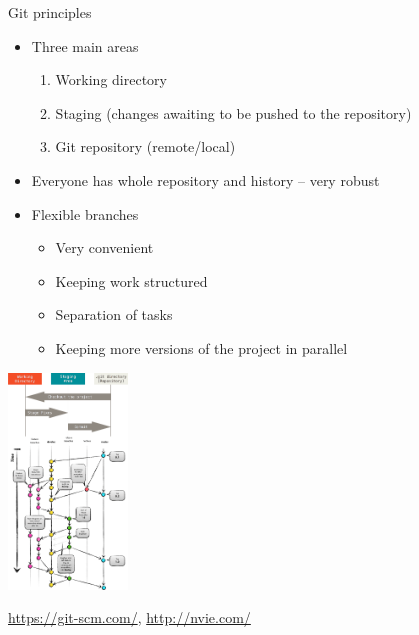 \documentclass[compress, ucs, xelatex, 11pt, xcolor=svgnames,
  hyperref={
    bookmarks=true,
    unicode=true,
    colorlinks=true,
    pdftitle={Linux, command line and MetaCentrum},
    plainpages=false,
    pdfauthor={Vojtech Zeisek},
    pdfsubject={Course about use of Linux command line, writing shell scripts and using MetaCentrum of CESNET},
    pdfcreator={XeLaTeX},
    pdfkeywords={Linux, GNU, BASH, shell, command line, MetaCentrum},
    linkcolor=DarkRed,
    anchorcolor=DarkBlue,
    citecolor=Indigo,
    filecolor=NavyBlue,
    menucolor=DarkMagenta,
    urlcolor=DarkBlue,
    pdftex},
  url={hyphens, lowtilde} %
  ]{beamer}
\begin{document}
\begin{frame}[fragile]{Git principles}
  \begin{multicols}{2}
    \begin{itemize}
      \item Three main areas
      \begin{enumerate}
	\item Working directory
	\item Staging (changes awaiting to be pushed to the repository)
	\item Git repository (remote/local)
      \end{enumerate}
      \item Everyone has whole repository and history -- very robust
      \item Flexible branches
      \begin{itemize}
	\item Very convenient
	\item Keeping work structured
	\item Separation of tasks
	\item Keeping more versions of the project in parallel
      \end{itemize}
    \end{itemize}
    \begin{center}
      \includegraphics[height=5.75cm]{git.png}
    \end{center}
    \begin{flushright}
      \begin{footnotesize}
	\href{https://git-scm.com/book/en/v2/Getting-Started-Git-Basics}{https://git-scm.com/}, \href{http://nvie.com/posts/a-successful-git-branching-model/}{http://nvie.com/}
      \end{footnotesize}
    \end{flushright}
  \end{multicols}
\end{frame}
\end{document}
